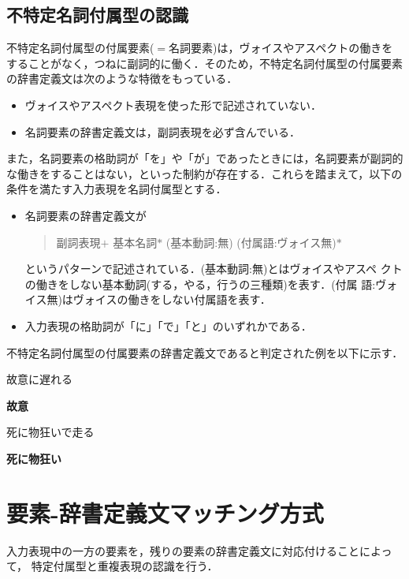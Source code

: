 \documentclass{nlp}
\begin{document}
\subsection{不特定名詞付属型の認識}
\label{section:nominalsupplement}
不特定名詞付属型の付属要素($=$名詞要素)は，ヴォイスやアスペクトの働きを
することがなく，つねに副詞的に働く．そのため，不特定名詞付属型の付属要素
の辞書定義文は次のような特徴をもっている．
\begin{itemize}
 \item ヴォイスやアスペクト表現を使った形で記述されていない．
 \item 名詞要素の辞書定義文は，副詞表現を必ず含んでいる．
\end{itemize}
また，名詞要素の格助詞が「を」や「が」であったときには，名詞要素が副詞的
な働きをすることはない，といった制約が存在する．これらを踏まえて，以下の
条件を満たす入力表現を名詞付属型とする．
\begin{itemize}
 \item 名詞要素の辞書定義文が
       \begin{quote}
	副詞表現$+$ 基本名詞$*$ (基本動詞:無) (付属語:ヴォイス無)$*$
       \end{quote}
       というパターンで記述されている．(基本動詞:無)とはヴォイスやアスペ
       クトの働きをしない基本動詞(する，やる，行うの三種類)を表す．(付属
       語:ヴォイス無)はヴォイスの働きをしない付属語を表す．
       
 \item 入力表現の格助詞が「に」「で」「と」のいずれかである．
\end{itemize}
不特定名詞付属型の付属要素の辞書定義文であると判定された例を以下に示す．
\begin{example}
 \item 故意に遅れる
 
 {\bf 故意} \hspace{10pt}

 \item 死に物狂いで走る
 
 {\bf 死に物狂い} \hspace{10pt}
\end{example}


\section{要素-辞書定義文マッチング方式}
入力表現中の一方の要素を，残りの要素の辞書定義文に対応付けることによって，
特定付属型と重複表現の認識を行う．
\end{document}
